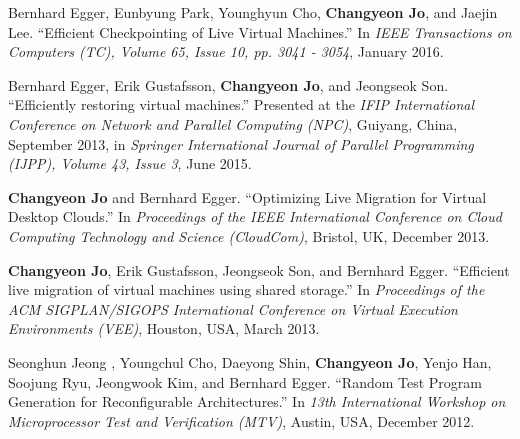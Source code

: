 \documentclass[margin]{res}
\begin{document}
\begin{resume}
\vspace{-0.5em}
Bernhard Egger, Eunbyung Park, Younghyun Cho, \textbf{Changyeon Jo}, and Jaejin Lee. ``Efficient Checkpointing of Live Virtual Machines.'' In \textit{IEEE Transactions on Computers (TC), Volume 65, Issue 10, pp. 3041 - 3054}, January 2016.

\vspace{-0.5em}
Bernhard Egger, Erik Gustafsson, \textbf{Changyeon Jo}, and Jeongseok Son. ``Efficiently restoring virtual machines.'' Presented at the \textit{IFIP International Conference on Network and Parallel Computing (NPC)}, Guiyang, China, September 2013, in \textit{Springer International Journal of Parallel Programming (IJPP), Volume 43, Issue 3}, June 2015.

\vspace{-0.5em}
\textbf{Changyeon Jo} and Bernhard Egger. ``Optimizing Live Migration for Virtual Desktop Clouds.'' In \textit{Proceedings of the IEEE International Conference on Cloud Computing Technology and Science (CloudCom)}, Bristol, UK, December 2013.

\vspace{-0.5em}
\textbf{Changyeon Jo}, Erik Gustafsson, Jeongseok Son, and Bernhard Egger. ``Efficient live migration of virtual machines using shared storage.'' In \textit{Proceedings of the ACM SIGPLAN/SIGOPS International Conference on Virtual Execution Environments (VEE)}, Houston, USA, March 2013.

\vspace{-0.5em}
Seonghun Jeong , Youngchul Cho, Daeyong Shin, \textbf{Changyeon Jo}, Yenjo Han, Soojung Ryu, Jeongwook Kim, and Bernhard Egger. ``Random Test Program Generation for Reconfigurable Architectures.'' In \textit{13th International Workshop on Microprocessor Test and Verification (MTV)}, Austin, USA, December 2012.




\end{resume}
\end{document}
